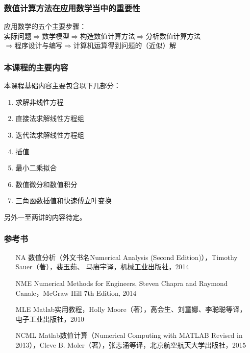 \documentclass[10pt]{beamer}
\begin{document}
\begin{frame}
\frametitle{数值计算方法在应用数学当中的重要性}
应用数学的五个主要步骤：\\
实际问题$\Rightarrow$数学模型$\Rightarrow$构造数值计算方法$\Rightarrow$分析数值计算方法\\
$\Rightarrow$程序设计与编写$\Rightarrow$计算机运算得到问题的（近似）解


\end{frame}

\begin{frame}
\frametitle{本课程的主要内容}
本课程基础内容主要包含以下几部分：
\begin{enumerate}
\item 求解非线性方程
\item 直接法求解线性方程组
\item 迭代法求解线性方程组
\item 插值
\item 最小二乘拟合
\item 数值微分和数值积分
\item 三角函数插值和快速傅立叶变换
\end{enumerate}
另外一至两讲的内容待定。

\end{frame}

\begin{frame}
\frametitle{参考书}
\begin{itemize}
\item [NA] 数值分析（外文书名Numerical Analysis (Second Edition)），Timothy Sauer（著），裴玉茹、 马赓宇译，机械工业出版社，2014 
\item [NME] Numerical Methods for Engineers, Steven Chapra and Raymond Canale，McGraw-Hill 7th Edition, 2014
\item [MLE] Matlab实用教程，Holly Moore（著），高会生、刘童娜、李聪聪等译，电子工业出版社，2010
\item [NCML] Matlab数值计算（Numerical Computing with MATLAB Revised in 2013），Cleve B. Moler（著），张志涌等译，北京航空航天大学出版社，2015
\end{itemize}

\end{frame}
\end{document}
